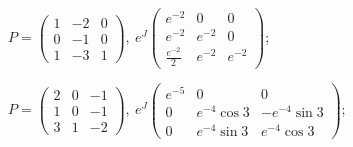 \begin{enumsols}
		\item \( P = \begin{pmatrix} 1 & -2 & 0 \\ 0 & -1 & 0 \\ 1 & -3 & 1 \end{pmatrix}, ~ e^{J} \begin{pmatrix} e^{-2} & 0 & 0 \\ e^{-2} & e^{-2} & 0 \\ \frac{e^{-2}}{2} & e^{-2} & e^{-2} \end{pmatrix} \); %
		\item \( P = \begin{pmatrix} 2 & 0 & -1 \\ 1 & 0 & -1 \\ 3 & 1 & -2 \end{pmatrix}, ~ e^{J} \begin{pmatrix} e^{-5} & 0 & 0 \\ 0 & e^{-4} \cos{3} & -e^{-4} \sin{3} \\ 0 & e^{-4} \sin{3} & e^{-4} \cos{3} \end{pmatrix} \); %


\end{enumsols}
